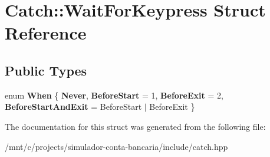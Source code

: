 \hypertarget{structCatch_1_1WaitForKeypress}{}\section{Catch\+:\+:Wait\+For\+Keypress Struct Reference}
\label{structCatch_1_1WaitForKeypress}
\subsection*{Public Types}
\begin{DoxyCompactItemize}
\item 
\mbox{\label{structCatch_1_1WaitForKeypress_a2e8c4369d0a605d64e3e83b5af3399ba}} 
enum {\bfseries When} \{ {\bfseries Never}, 
{\bfseries Before\+Start} = 1, 
{\bfseries Before\+Exit} = 2, 
{\bfseries Before\+Start\+And\+Exit} = Before\+Start $\vert$ Before\+Exit
 \}
\end{DoxyCompactItemize}


The documentation for this struct was generated from the following file\+:\begin{DoxyCompactItemize}
\item 
/mnt/c/projects/simulador-\/conta-\/bancaria/include/catch.\+hpp\end{DoxyCompactItemize}
